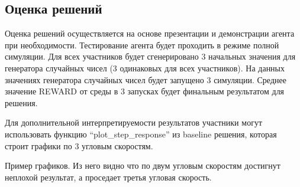 \subsection*{Оценка решений}

Оценка решений осуществляется на основе презентации и демонстрации агента при необходимости. Тестирование агента будет проходить в режиме полной симуляции. Для всех участников будет сгенерировано 3 начальных значения для генератора случайных чисел (3 одинаковых для всех участников). На данных значениях генератора случайных чисел будет запущено 3 симуляции. Среднее значение REWARD от среды в 3 запусках будет финальным результатом для решения.  

Для дополнительной интерпретируемости результатов участники могут использовать функцию “plot\_step\_response” из baseline решения, которая строит графики по 3 угловым скоростям.


Пример графиков. Из него видно что по двум угловым скоростям достигнут неплохой результат, а проседает третья угловая скорость. 


